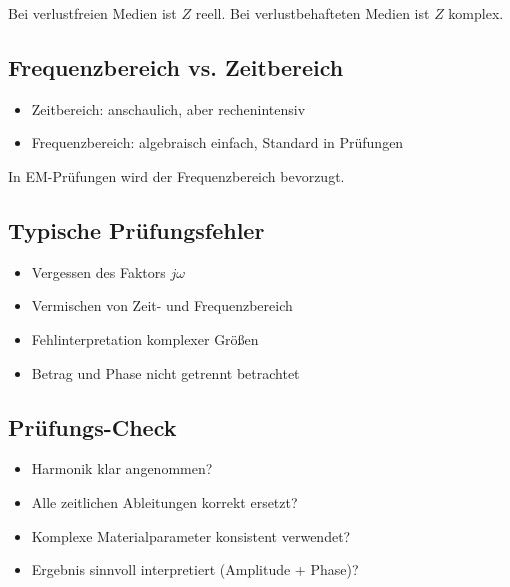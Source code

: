 \documentclass[a4paper]{article}
\begin{document}
\begin{checkitem}
Bei verlustfreien Medien ist $Z$ reell.
Bei verlustbehafteten Medien ist $Z$ komplex.
\end{checkitem}

\subsection{Frequenzbereich vs. Zeitbereich}

\begin{schema}
\begin{itemize}
  \item Zeitbereich: anschaulich, aber rechenintensiv
  \item Frequenzbereich: algebraisch einfach, Standard in Prüfungen
\end{itemize}
\end{schema}

\begin{merke}
In EM-Prüfungen wird der Frequenzbereich bevorzugt.
\end{merke}

\subsection{Typische Prüfungsfehler}

\begin{abwandlung}
\begin{itemize}
  \item Vergessen des Faktors $j\omega$
  \item Vermischen von Zeit- und Frequenzbereich
  \item Fehlinterpretation komplexer Größen
  \item Betrag und Phase nicht getrennt betrachtet
\end{itemize}
\end{abwandlung}

\subsection{Prüfungs-Check}

\begin{checkitem}
\begin{itemize}
  \item Harmonik klar angenommen?
  \item Alle zeitlichen Ableitungen korrekt ersetzt?
  \item Komplexe Materialparameter konsistent verwendet?
  \item Ergebnis sinnvoll interpretiert (Amplitude + Phase)?
\end{itemize}
\end{checkitem}
\end{document}
